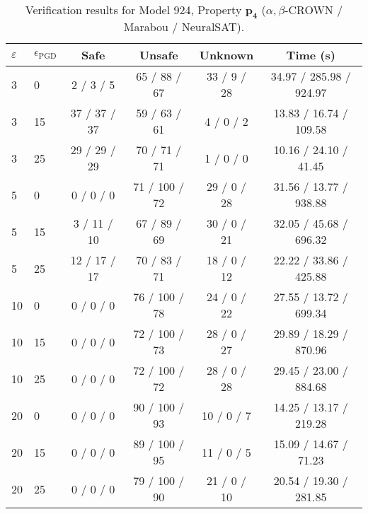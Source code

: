 \begin{table}[htbp]\centering
\caption{\small Verification results for Model 924, Property $\mathbf{p_{4}}$ ($\alpha,\beta$-CROWN / Marabou / NeuralSAT).}
\label{tab:model924_p4}
\begin{tabular}{llcccc}
\toprule
$\varepsilon$ & $\epsilon_{\scriptscriptstyle\mathrm{PGD}}$ & Safe & Unsafe & Unknown & Time (s) \\
\midrule
3 & 0 & 2 / 3 / 5 & 65 / 88 / 67 & 33 / 9 / 28 & 34.97 / 285.98 / 924.97 \\
3 & 15 & 37 / 37 / 37 & 59 / 63 / 61 & 4 / 0 / 2 & 13.83 / 16.74 / 109.58 \\
3 & 25 & 29 / 29 / 29 & 70 / 71 / 71 & 1 / 0 / 0 & 10.16 / 24.10 / 41.45 \\
5 & 0 & 0 / 0 / 0 & 71 / 100 / 72 & 29 / 0 / 28 & 31.56 / 13.77 / 938.88 \\
5 & 15 & 3 / 11 / 10 & 67 / 89 / 69 & 30 / 0 / 21 & 32.05 / 45.68 / 696.32 \\
5 & 25 & 12 / 17 / 17 & 70 / 83 / 71 & 18 / 0 / 12 & 22.22 / 33.86 / 425.88 \\
10 & 0 & 0 / 0 / 0 & 76 / 100 / 78 & 24 / 0 / 22 & 27.55 / 13.72 / 699.34 \\
10 & 15 & 0 / 0 / 0 & 72 / 100 / 73 & 28 / 0 / 27 & 29.89 / 18.29 / 870.96 \\
10 & 25 & 0 / 0 / 0 & 72 / 100 / 72 & 28 / 0 / 28 & 29.45 / 23.00 / 884.68 \\
20 & 0 & 0 / 0 / 0 & 90 / 100 / 93 & 10 / 0 / 7 & 14.25 / 13.17 / 219.28 \\
20 & 15 & 0 / 0 / 0 & 89 / 100 / 95 & 11 / 0 / 5 & 15.09 / 14.67 / 71.23 \\
20 & 25 & 0 / 0 / 0 & 79 / 100 / 90 & 21 / 0 / 10 & 20.54 / 19.30 / 281.85 \\
\bottomrule
\end{tabular}
\end{table}
